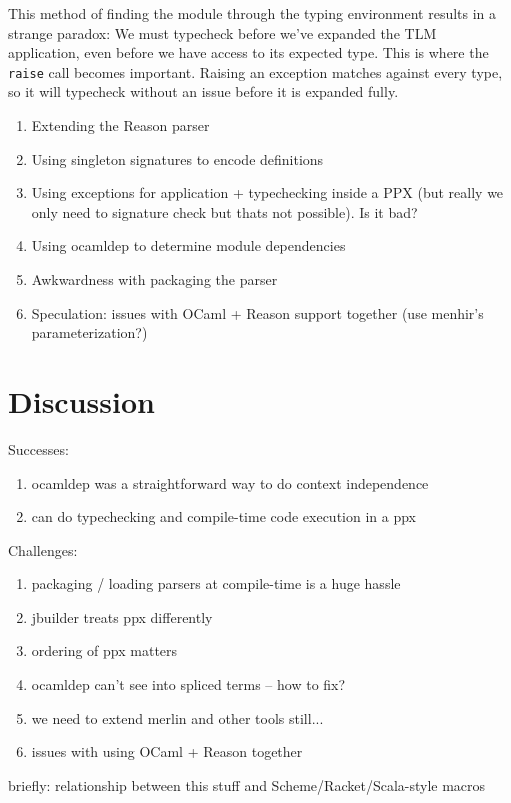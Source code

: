 \documentclass[acmsmall,review]{acmart}
\newcommand{\li}[1]{\lstinline[basicstyle=\ttfamily\fontsize{9pt}{1em}\selectfont]{#1}}
\theoremstyle{slplain}
\numberwithin{thm}{section}
\begin{document}
This method of finding the module through the typing environment results in a strange paradox: We must typecheck before we've expanded the TLM application, even before we have access to its expected type. This is where the \li{raise} call becomes important. Raising an exception matches against every type, so it will typecheck without an issue before it is expanded fully.

\begin{enumerate}
  \item Extending the Reason parser
  \item Using singleton signatures to encode definitions
  \item Using exceptions for application + typechecking inside a PPX (but really we only need to signature check but thats not possible). Is it bad?
  \item Using ocamldep to determine module dependencies
  \item Awkwardness with packaging the parser
  \item Speculation: issues with OCaml + Reason support together (use menhir's parameterization?)
\end{enumerate}
\section{Discussion}
Successes:
\begin{enumerate}
  \item ocamldep was a straightforward way to do context independence
  \item can do typechecking and compile-time code execution in a ppx
\end{enumerate}

Challenges:
\begin{enumerate}
  \item packaging / loading parsers at compile-time is a huge hassle
  \item jbuilder treats ppx differently
  \item ordering of ppx matters
  \item ocamldep can't see into spliced terms -- how to fix?
  \item we need to extend merlin and other tools still...
  \item issues with using OCaml + Reason together
\end{enumerate}

briefly: relationship between this stuff and Scheme/Racket/Scala-style macros



% 
\end{document}
